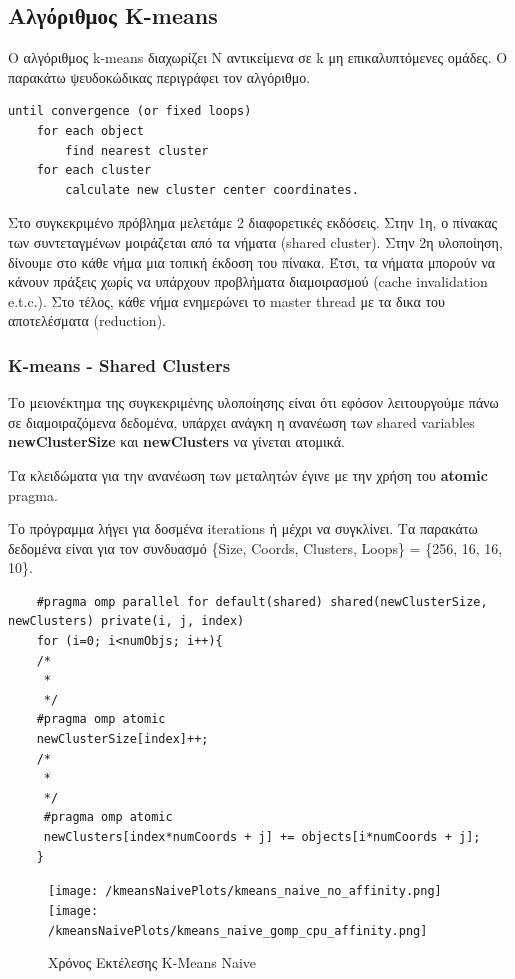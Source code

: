 \documentclass[letterpaper,12pt]{article}
\begin{document}
\subsection{Αλγόριθμος K-means}

Ο αλγόριθμος k-means διαχωρίζει N αντικείμενα σε k μη επικαλυπτόμενες ομάδες. Ο παρακάτω ψευδοκώδικας περιγράφει τον αλγόριθμο.

\begin{lstlisting}
until convergence (or fixed loops)
    for each object
        find nearest cluster
    for each cluster
        calculate new cluster center coordinates.
\end{lstlisting}

Στο συγκεκριμένο πρόβλημα μελετάμε 2 διαφορετικές εκδόσεις. Στην 1η, ο πίνακας των συντεταγμένων μοιράζεται από τα νήματα (shared cluster).
Στην 2η υλοποίηση, δίνουμε στο κάθε νήμα μια τοπική έκδοση του πίνακα. Έτσι, τα νήματα μπορούν να κάνουν πράξεις
χωρίς να υπάρχουν προβλήματα διαμοιρασμού (cache invalidation e.t.c.). Στο τέλος, κάθε νήμα ενημερώνει το
master thread με τα δικα του αποτελέσματα (reduction).

\subsubsection{K-means - Shared Clusters}

Το μειονέκτημα της συγκεκριμένης υλοποίησης είναι ότι εφόσον λειτουργούμε πάνω σε διαμοιραζόμενα δεδομένα, υπάρχει
ανάγκη η ανανέωση των shared variables \textbf{newClusterSize} και \textbf{newClusters} να γίνεται ατομικά.

Τα κλειδώματα για την ανανέωση των μεταλητών έγινε με την χρήση του \textbf{atomic} pragma.

Το πρόγραμμα λήγει για δοσμένα iterations ή μέχρι να συγκλίνει. Τα παρακάτω δεδομένα είναι για τον συνδυασμό
\{Size, Coords, Clusters, Loops\} = \{256, 16, 16, 10\}.

\begin{lstlisting}
    #pragma omp parallel for default(shared) shared(newClusterSize, newClusters) private(i, j, index)
    for (i=0; i<numObjs; i++){
    /*
     *
     */
    #pragma omp atomic
    newClusterSize[index]++;
    /*
     *
     */
     #pragma omp atomic
     newClusters[index*numCoords + j] += objects[i*numCoords + j];
    }
\end{lstlisting}

\begin{figure}[H]
    \centering
    \texttt{[image: /kmeansNaivePlots/kmeans\_naive\_no\_affinity.png]}
    \texttt{[image: /kmeansNaivePlots/kmeans\_naive\_gomp\_cpu\_affinity.png]}
    \caption{Χρόνος Εκτέλεσης K-Means Naive}
    \label{fig:Χρόνος Εκτέλεσης K-Means Naive}
\end{figure}
\end{document}
